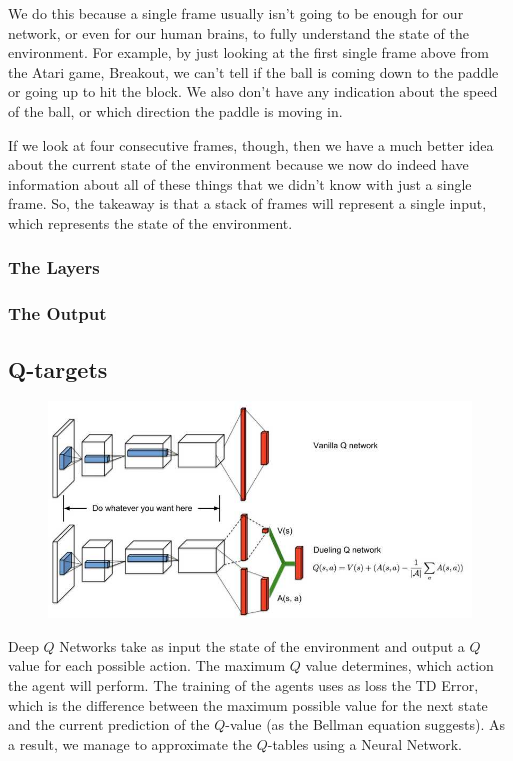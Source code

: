 We do this because a single frame usually isn't going to be enough for our network, 
or even for our human brains, to fully understand the state of the environment. For 
example, by just looking at the first single frame above from the Atari game, 
Breakout, we can't tell if the ball is coming down to the paddle or going up to hit 
the block. We also don't have any indication about the speed of the ball, or which 
direction the paddle is moving in.

If we look at four consecutive frames, though, then we have a much better idea about 
the current state of the environment because we now do indeed have information about 
all of these things that we didn't know with just a single frame. So, the takeaway 
is that a stack of frames will represent a single input, which represents the state 
of the environment.


\subsubsection{The Layers}


\subsubsection{The Output}


\subsection{Q-targets}

\begin{figure}[H]
\centering
\includegraphics[scale=0.5]{pix/q_learning/DDQN.jpg}
\end{figure}

Deep $Q$ Networks take as input the state of the environment and output a $Q$ value for 
each possible action. The maximum $Q$ value determines, which action the agent will 
perform. The training of the agents uses as loss the TD Error, which is the difference 
between the maximum possible value for the next state and the current prediction of the 
$Q$-value (as the Bellman equation suggests). As a result, we manage to approximate the
$Q$-tables using a Neural Network.

